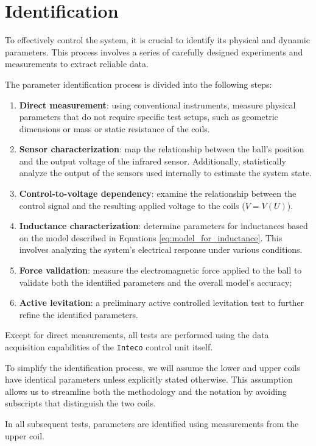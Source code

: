 \section{Identification}
\label{sec:identification}

To effectively control the system, it is crucial to identify its physical and dynamic parameters.
This process involves a series of carefully designed experiments and measurements to extract reliable data.

The parameter identification process is divided into the following steps:

\begin{enumerate}
    \item \textbf{Direct measurement}: using conventional instruments, measure physical parameters that do not require specific test setups, such as geometric dimensions or mass or static resistance of the coils.
    \item \textbf{Sensor characterization}: map the relationship between the ball's position and the output voltage of the infrared sensor. Additionally, statistically analyze the output of the sensors used internally to estimate the system state.
    \item \textbf{Control-to-voltage dependency}: examine the relationship between the control signal and the resulting applied voltage to the coils ($V = V(U)$).
    \item \textbf{Inductance characterization}: determine parameters for inductances based on the model described in Equations \ref{eq:model_for_inductance}. This involves analyzing the system's electrical response under various conditions.
    \item \textbf{Force validation}: measure the electromagnetic force applied to the ball to validate both the identified parameters and the overall model's accuracy;
    \item \textbf{Active levitation}: a preliminary active controlled levitation test to further refine the identified parameters.
\end{enumerate}

Except for direct measurements, all tests are performed using the data acquisition capabilities of the \texttt{Inteco} control unit itself.

To simplify the identification process, we will assume the lower and upper coils have identical parameters unless explicitly stated otherwise.
This assumption allows us to streamline both the methodology and the notation by avoiding subscripts that distinguish the two coils.

In all subsequent tests, parameters are identified using measurements from the upper coil.







